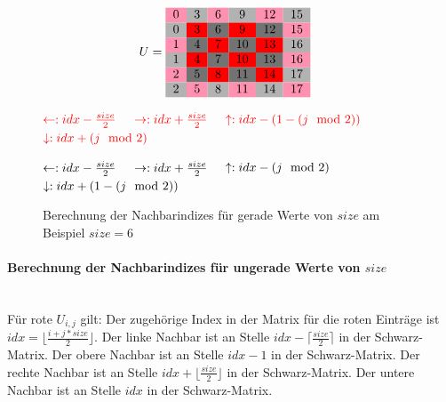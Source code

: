 \documentclass{article}
\begin{document}
\begin{figure}[h!]
\centering
$$U = 
\begin{tabular}{cccccc}
  \cellcolor{rose}0 & \cellcolor[gray]{0.7}3 & \cellcolor{rose}6 & \cellcolor[gray]{0.7}9 & \cellcolor{rose}12 & \cellcolor[gray]{0.7}15\\
  
 \cellcolor[gray]{0.7}0 & \cellcolor{red}3 & \cellcolor[gray]{0.45}6 & \cellcolor{red}9 & \cellcolor[gray]{0.45}12 & \cellcolor{rose}15\\
 
  \cellcolor{rose}1 & \cellcolor[gray]{0.45}4 & \cellcolor{red}7 & \cellcolor[gray]{0.45}10 & \cellcolor{red}13 & \cellcolor[gray]{0.7}16\\
  
 \cellcolor[gray]{0.7}1 & \cellcolor{red}4 & \cellcolor[gray]{0.45}7 & \cellcolor{red}10 & \cellcolor[gray]{0.45}13 & \cellcolor{rose}16 \\
 
 \cellcolor{rose}2 & \cellcolor[gray]{0.45}5 & \cellcolor{red}8 & \cellcolor[gray]{0.45}11 & \cellcolor{red}14 & \cellcolor[gray]{0.7}17\\
 
 \cellcolor[gray]{0.7}2 & \cellcolor{rose}5 & \cellcolor[gray]{0.7}8 & \cellcolor{rose}11 & \cellcolor[gray]{0.7}14 & \cellcolor{rose}17\\
\end{tabular} \quad
$$

$\textcolor{red}{\leftarrow: idx - \frac{size}{2}} \quad$
$\textcolor{red}{\rightarrow: idx + \frac{size}{2}} \quad$
$\textcolor{red}{\uparrow: idx - (1-(j \mod 2))} \quad$
$\textcolor{red}{\downarrow: idx + (j \mod 2)} \quad$

$\textcolor{black}{\leftarrow: idx - \frac{size}{2}} \quad$
$\textcolor{black}{\rightarrow: idx + \frac{size}{2}} \quad$
$\textcolor{black}{\uparrow: idx - (j \mod 2)} \quad$
$\textcolor{black}{\downarrow: idx + (1- (j \mod 2))} \quad$

\caption{Berechnung der Nachbarindizes für gerade Werte von $size$ am Beispiel $size=6$}
\label{fig:matrix:even}
\end{figure}

\paragraph{Berechnung der Nachbarindizes für ungerade Werte von $size$}~\\
Für rote $U_{i,j}$ gilt: Der zugehörige Index in der Matrix für die roten Einträge ist $idx = \lfloor\frac{i+j*size}{2}\rfloor$. Der linke Nachbar ist an Stelle $idx - \lceil\frac{size}{2}\rceil$ in der Schwarz-Matrix. Der obere Nachbar ist an Stelle $idx - 1$ in der Schwarz-Matrix. Der rechte Nachbar ist an Stelle $idx + \lfloor\frac{size}{2}\rfloor$ in der Schwarz-Matrix. Der untere Nachbar ist an Stelle $idx$ in der Schwarz-Matrix.
\end{document}
